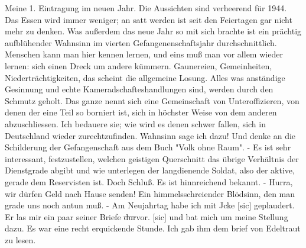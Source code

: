 \def\day{4. Januar 1944.}
\mktitle

Meine 1. Eintragung im neuen Jahr.
Die Aussichten sind verheerend f\"{u}r 1944.
Das Essen wird immer weniger; an satt werden ist seit den Feiertagen gar nicht mehr zu denken.
Was au{\ss}erdem das neue Jahr so mit sich brachte ist ein pr\"{a}chtig aufbl\"{u}hender Wahnsinn im vierten Gefangenenschaftsjahr durchschnittlich.
Menschen kann man hier kennen lernen, und eins mu{\ss} man vor allem wieder lernen: sich einen Dreck um andere k\"{u}mmern.
Gaunereien, Gemeinheiten, Niedertr\"{a}chtigkeiten, das scheint die allgemeine Losung.
Alles was anst\"{a}ndige Gesinnung und echte Kameradschafteshandlungen sind, werden durch den Schmutz geholt.
Das ganze nennt sich eine Gemeinschaft von Unteroffizieren, von denen der eine Teil so borniert ist, sich in h\"{o}chster Weise von dem anderen abzuschliessen.
Ich bedauere sie; wie wird es denen schwer fallen, sich in Deutschland wieder zurechtzufinden.
Wahnsinn sage ich dazu!
Und denke an die Schilderung der Gefangenschaft aus dem Buch "Volk ohne Raum".
- Es ist sehr interessant, festzustellen, welchen geistigen Querschnitt das \"{u}brige Verh\"{a}ltnis der Dienstgrade abgibt und wie unterlegen der langdienende Soldat, also der aktive, gerade dem Reservisten ist.
Doch Schlu{\ss}.
Es ist hinnreichend bekannt.
- Hurra, wir d\"{u}rfen Geld nach Hause senden!
Ein himmelsschreiender Bl\"{o}dsinn, den man grade uns noch antun mu{\ss}.
- Am Neujahrtag habe ich mit Jcke{\color{red} [sic] } geplaudert.
Er las mir ein paar seiner Briefe \st{dur}vor.{\color{red} [sic] } und bat mich um meine Stellung dazu.
Es war eine recht erquickende Stunde.
Ich gab ihm dem brief von Edeltraut zu lesen.

\clearpage
